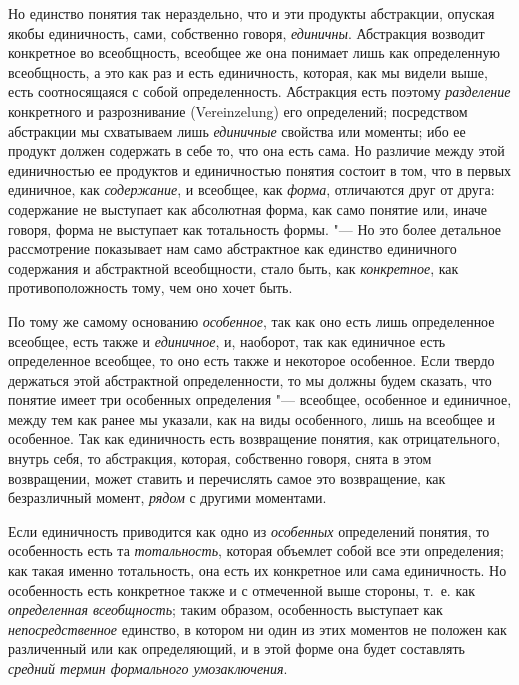 {Но единство понятия так нераздельно, что и эти продукты
абстракции, опуская якобы единичность, сами, собственно говоря,
{\em единичны}.
Абстракция возводит конкретное во всеобщность, всеобщее же
она понимает лишь как определенную всеобщность, а это как раз и есть
единичность, которая, как мы видели выше, есть соотносящаяся с собой
определенность. Абстракция есть поэтому
{\em разделение}
конкретного и разрознивание (Vereinzelung) его
определений; посредством абстракции мы схватываем лишь
{\em единичные} свойства
или моменты; ибо ее продукт должен содержать в себе то, что она есть сама.
Но различие между этой единичностью ее продуктов и единичностью понятия
состоит в том, что в первых единичное, как
{\em содержание}, и
всеобщее, как {\em форма},
отличаются друг от друга: содержание не выступает как
абсолютная форма, как само понятие или, иначе говоря, форма не выступает
как тотальность формы. "--- Но это более детальное рассмотрение
показывает нам само абстрактное как единство единичного содержания и
абстрактной всеобщности, стало быть, как
{\em конкретное}, как
противоположность тому, чем оно хочет быть.

По тому же самому основанию
{\em особенное}, так как
оно есть лишь определенное всеобщее, есть также и
{\em единичное}, и,
наоборот, так как единичное есть определенное всеобщее, то оно есть также и
некоторое особенное. Если твердо держаться этой абстрактной определенности,
то мы должны будем сказать, что понятие имеет три особенных
определения "--- всеобщее, особенное и
единичное, между тем как ранее мы указали, как на виды особенного, лишь на
всеобщее и особенное. Так как единичность есть возвращение понятия, как
отрицательного, внутрь себя, то абстракция, которая, собственно говоря,
снята в этом возвращении, может ставить и перечислять самое это
возвращение, как безразличный момент,
{\em рядом} с другими моментами.

Если единичность приводится как одно из
{\em особенных}
определений понятия, то особенность есть та
{\em тотальность},
которая объемлет собой все эти определения; как такая именно
тотальность, она есть их конкретное или сама единичность. Но особенность
есть конкретное также и с отмеченной выше стороны, т.~е. как
{\em определенная всеобщность};
таким образом, особенность выступает как
{\em непосредственное}
единство, в котором ни один из этих моментов не положен как
различенный или как определяющий, и в этой форме она будет составлять
{\em средний термин формального умозаключения}.

}
